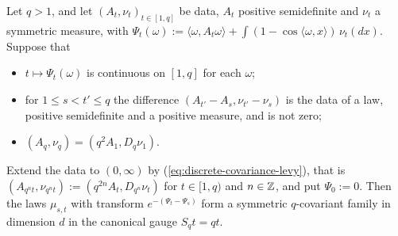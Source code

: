 \begin{lemma}[synthesis]
\label{lem:synthesis}

Let $q > 1$, and let $(A_t, \nu_t)_{t \in [1,q]}$ be \Levy{} data, $A_t$ positive semidefinite and
$\nu_t$ a symmetric \Levy{} measure, with
$\Psi_t(\omega) := \langle\omega, A_t\omega\rangle + \int(1 - \cos\langle\omega, x\rangle)\,\nu_t(dx)$.
Suppose that
\begin{itemize}
\item $t \mapsto \Psi_t(\omega)$ is continuous on $[1,q]$ for each $\omega$;
\item for $1 \le s < t' \le q$ the difference $(A_{t'} - A_s, \nu_{t'} - \nu_s)$ is the data of a law,
positive semidefinite and a positive measure, and is not zero;
\item $(A_q, \nu_q) = (q^2A_1, D_q\nu_1)$.
\end{itemize}
Extend the data to $(0,\infty)$ by (\ref{eq:discrete-covariance-levy}), that is
$(A_{q^nt}, \nu_{q^nt}) := (q^{2n}A_t, D_{q^n}\nu_t)$ for $t \in [1, q)$ and $n \in \mathbb{Z}$, and put
$\Psi_0 := 0$. Then the laws $\mu_{s,t}$ with transform $e^{-(\Psi_t - \Psi_s)}$ form a symmetric
$q$-covariant family in dimension $d$ in the canonical gauge $S_qt = qt$.
\end{lemma}

